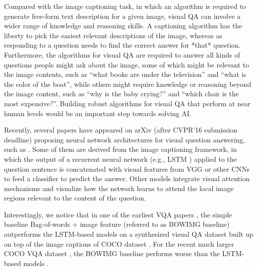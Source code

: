 \documentclass{article} %
\begin{document}
Compared with the image captioning task, in which an algorithm is required to generate free-form text description for a given image, visual QA can involve a wider range of knowledge and reasoning skills. A captioning algorithm has the liberty to pick the easiest relevant descriptions of the image, whereas as responding to a question needs to find the correct answer for *that* question.   Furthermore, the algorithms for visual QA are required to answer all kinds of questions people might ask about the image, some of which might be relevant to the image contents, such as ``what books are under the television'' and ``what is the color of the boat'', while others might require knowledge or reasoning beyond the image content, such as ``why is the baby crying?'' and ``which chair is the most expensive?''.   Building robust algorithms for visual QA that perform at near human levels would be an important step towards solving AI. 



Recently, several papers have appeared on arXiv (after CVPR'16 submission deadline) proposing neural network architectures for visual question answering, such as \cite{shih2015look,xu2015ask,gao2015you,yang2015stacked,wu2015ask,chen2015abc,noh2015image,andreas2015deep}. Some of them are derived from the image captioning framework, in which the output of a recurrent neural network (e.g., LSTM \cite{wu2015ask, noh2015image, andreas2015deep}) applied to the question sentence is concatenated with visual features from VGG or other CNNs to feed a classifier to predict the answer. Other models integrate visual attention mechanisms \cite{xu2015ask,shih2015look,chen2015abc} and visualize how the network learns to attend the local image regions relevant to the content of the question.   

Interestingly, we notice that in one of the earliest VQA papers \cite{ren2015exploring}, the simple baseline Bag-of-words + image feature (referred to as BOWIMG baseline) outperforms the LSTM-based models on a synthesized visual QA dataset built up on top of the image captions of COCO dataset \cite{lin2014microsoft}. For the recent much larger COCO VQA dataset \cite{antol2015vqa}, the BOWIMG baseline performs worse than the LSTM-based models \cite{antol2015vqa}. 
\end{document}
